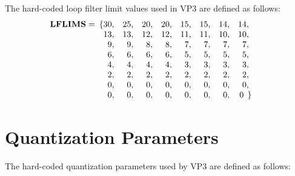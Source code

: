 \documentclass[9pt,letterpaper]{book}
\newcommand{\bitvar}[1]{\ensuremath{\mathbf{\bm{#1}}}}
\numberwithin{equation}{chapter}
\numberwithin{figure}{chapter}
\numberwithin{table}{chapter}
\begin{document}
The hard-coded loop filter limit values used in VP3 are defined as follows:
\begin{align*}
\bitvar{LFLIMS} = & \begin{array}[t]{r@{}rrrrrrrr@{}l}
\{ & 30, & 25, & 20, & 20, & 15, & 15, & 14, & 14,   &      \\
   & 13, & 13, & 12, & 12, & 11, & 11, & 10, & 10,   &      \\
   &  9, &  9, &  8, &  8, &  7, &  7, &  7, &  7,   &      \\
   &  6, &  6, &  6, &  6, &  5, &  5, &  5, &  5,   &      \\
   &  4, &  4, &  4, &  4, &  3, &  3, &  3, &  3,   &      \\
   &  2, &  2, &  2, &  2, &  2, &  2, &  2, &  2,   &      \\
   &  0, &  0, &  0, &  0, &  0, &  0, &  0, &  0,   &      \\
   &  0, &  0, &  0, &  0, &  0, &  0, &  0, &  0\;\ & \!\} \\
\end{array}
\end{align*}

\section{Quantization Parameters}
\label{app:vp3-quant-params}

The hard-coded quantization parameters used by VP3 are defined as follows:
\end{document}
